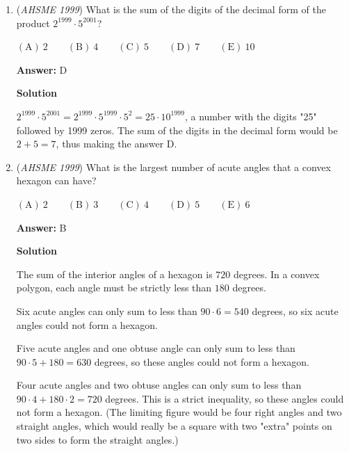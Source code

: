 \begin{enumerate}
 \textbf{Answer: }C



\textbf{Solution}

Without loss of generality, let's assume that the retail price was $100$ USD.

 The marked price of the book is $30 \%$ off of $100$ which is equal to $100-100(0.3)=70.$

 Half of that marked price is $0.5(70)=35.$

 Therefore the percent Alice payed of the suggested retail price is $35/100=\boxed{\mathrm{(C) } 35 \%}.$



	\item (\textit{AHSME 1999}) What is the sum of the digits of the decimal form of the product $2^{1999} \cdot 5^{2001}$?


 $\mathrm{(A) \ }2 \qquad \mathrm{(B) \ }4 \qquad \mathrm{(C) \ }5 \qquad \mathrm{(D) \ }7 \qquad \mathrm{(E) \ }10$

 \textbf{Answer: }D



\textbf{Solution}

$2^{1999}\cdot5^{2001}=2^{1999}\cdot5^{1999}\cdot5^{2}=25\cdot10^{1999}$, a number with the digits "25" followed by 1999 zeros. The sum of the digits in the decimal form would be $2+5=7$, thus making the answer $\boxed{\text{D}}$.

 


	\item (\textit{AHSME 1999}) What is the largest number of acute angles that a convex hexagon can have? 


 $\mathrm{(A) \ }2 \qquad \mathrm{(B) \ }3 \qquad \mathrm{(C) \ }4 \qquad \mathrm{(D) \ }5 \qquad \mathrm{(E) \ }6$

 \textbf{Answer: }B



\textbf{Solution}

The sum of the interior angles of a hexagon is $720$ degrees.  In a convex polygon, each angle must be strictly less than $180$ degrees.  

 Six acute angles can only sum to less than $90\cdot 6 = 540$ degrees, so six acute angles could not form a hexagon.

 Five acute angles and one obtuse angle can only sum to less than $90\cdot 5 + 180 = 630$ degrees, so these angles could not form a hexagon.

 Four acute angles and two obtuse angles can only sum to less than $90\cdot 4 + 180\cdot 2 = 720$ degrees.  This is a strict inequality, so these angles could not form a hexagon.  (The limiting figure would be four right angles and two straight angles, which would really be a square with two "extra" points on two sides to form the straight angles.)


\end{enumerate}
